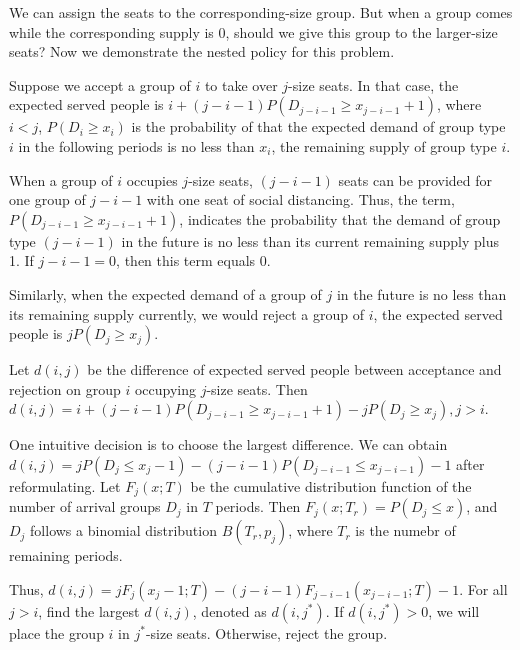We can assign the seats to the corresponding-size group. But when a group comes while the corresponding supply is 0, should we give this group to the larger-size seats? Now we demonstrate the nested policy for this problem.

Suppose we accept a group of $i$ to take over $j$-size seats. In that case, the expected served people is $i + (j-i-1)P(D_{j-i-1} \geq x_{j-i-1}+1)$, where $i < j$, $P(D_i \geq x_i)$ is the probability of that the expected demand of group type $i$ in the following periods is no less than $x_i$, the remaining supply of group type $i$.

When a group of $i$ occupies $j$-size seats, $(j-i-1)$ seats can be provided for one group of $j-i-1$ with one seat of social distancing.
Thus, the term, $P(D_{j-i-1} \geq x_{j-i-1}+1)$, indicates the probability that the demand of group type $(j-i-1)$ in the future is no less than its current remaining supply plus 1. If $j -i-1 =0$, then this term equals 0.

Similarly, when the expected demand of a group of $j$ in the future is no less than its remaining supply currently, we would reject a group of $i$, the expected served people is $j P(D_{j} \geq x_{j})$.

Let $d(i,j)$ be the difference of expected served people between acceptance and rejection on group $i$ occupying $j$-size seats. Then $d(i,j) = i + (j-i-1)P(D_{j-i-1} \geq x_{j-i-1}+1) - j P(D_{j} \geq x_{j}), j >i$.

One intuitive decision is to choose the largest difference.
We can obtain $d(i,j) = j P(D_{j} \leq x_{j} -1) - (j-i-1)P(D_{j-i-1} \leq x_{j-i-1}) -1$ after reformulating. 
Let $F_{j}(x;T)$ be the cumulative distribution function of the number of arrival groups $D_{j}$ in $T$ periods. Then $F_{j}(x; T_{r}) = P(D_{j} \leq x)$, and $D_{j}$ follows a binomial distribution $B(T_{r}, p_{j})$, where $T_{r}$ is the numebr of remaining periods.

Thus, $d(i,j) = j F_{j}(x_{j}-1; T) - (j-i-1) F_{j-i-1}(x_{j-i-1}; T) -1$. For all $j >i$, find the largest $d(i,j)$, denoted as $d(i,j^{*})$. If $d(i,j^{*}) >0$, we will place the group $i$ in $j^{*}$-size seats. Otherwise, reject the group.



